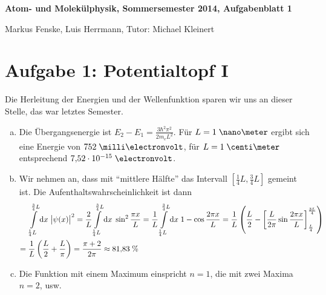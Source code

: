 \documentclass[a4paper,german,12pt,smallheadings]{scrartcl}
\begin{document}
\allowdisplaybreaks %
\begin{center}
\bfseries %
\sffamily %
\vspace{-40pt}
Atom- und Molekülphysik, Sommersemester 2014, Aufgabenblatt 1

Markus Fenske, Luis Herrmann, Tutor: Michael Kleinert
\vspace{-10pt}
\end{center}
\section*{Aufgabe 1: Potentialtopf I}

Die Herleitung der Energien und der Wellenfunktion sparen wir uns an dieser
Stelle, das war letztes Semester.

\begin{enumerate}[a)]
  \item
    Die Übergangsenergie ist $E_2 - E_1 = \frac{3 \hbar^2 \pi^2}{2 m_e L^2}$.
    Für $L = 1 \; \nano\meter$ ergibt sich eine Energie von $752 \;
    \milli\electronvolt$, für $L = 1 \; \centi\meter$ entsprechend $7{,}52 \cdot
    10^{-15} \;\electronvolt$.
  \item
    Wir nehmen an, dass mit ``mittlere Hälfte'' das Intervall $[\frac{1}{4} L,
    \frac{3}{4} L]$ gemeint ist. Die Aufenthaltswahrscheinlichkeit ist dann
    \begin{align}
        &\int\limits_{\frac{1}{4} L}^{\frac{3}{4} L} \dif x\; \envert{\psi(x)}^2
      =  \frac{2}{L} \int\limits_{\frac{1}{4} L}^{\frac{3}{4} L} \dif x\; \sin^2 \frac{\pi x}{L}
      =  \frac{1}{L} \int\limits_{\frac{1}{4} L}^{\frac{3}{4} L} \dif x\; 1 - \cos \frac{2 \pi x}{L}
      =  \frac{1}{L} \del{ \frac{L}{2} - \sbr{\frac{L}{2 \pi} \sin \frac{2 \pi x}{L}}_{\frac{L}{4}}^{\frac{3L}{4}} } \\
      = \;&\frac{1}{L} \del{\frac{L}{2} + \frac{L}{\pi}}
      = \frac{\pi + 2}{2 \pi}
      \approx 81{,}83 \; \%
    \end{align}
  \item
    Die Funktion mit einem Maximum einspricht $n=1$, die mit zwei Maxima $n=2$, usw.

\end{enumerate}
\end{document}
